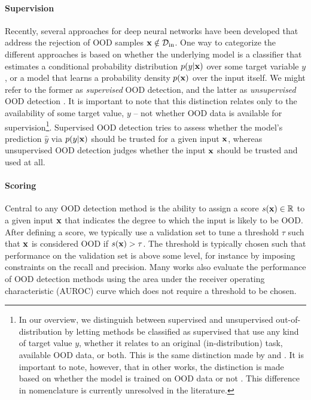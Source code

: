 \paragraph{Supervision} Recently, several approaches for deep neural networks have been developed that address the rejection of OOD samples ${\mathbf{x}}\notin\mathcal{D}_{\text{in}}$. 
One way to categorize the different approaches is based on whether the underlying model is a classifier that estimates a conditional probability distribution $p(y|{\mathbf{x}})$ over some target variable $y$, or a model that learns a probability density $p({\mathbf{x}})$ over the input itself. We might refer to the former as \emph{supervised} OOD detection, and the latter as \emph{unsupervised} OOD detection \parencite{graham_denoising_2023,liu_unsupervised_2023a}. It is important to note that this distinction relates only to the availability of some target value, $y$ -- not whether OOD data is available for supervision\footnote{
    In our overview, we distinguish between supervised and unsupervised out-of-distribution by letting methods be classified as supervised that use any kind of target value $y$, whether it relates to an original (in-distribution) task, available OOD data, or both. This is the same distinction made by \textcite{graham_denoising_2023} and \textcite{liu_unsupervised_2023a}. 
    It is important to note, however, that in other works, the distinction is made based on whether the model is trained on OOD data or not \parencite{hendrycks_baseline_2017,liu_energybased_2020}. This difference in nomenclature is currently unresolved in the literature. 
}. 
Supervised OOD detection tries to assess whether the model's prediction $\hat{y}$ via $p(y|{\mathbf{x}})$ should be trusted for a given input ${\mathbf{x}}$, whereas unsupervised OOD detection judges whether the input ${\mathbf{x}}$ should be trusted and used at all. 

\paragraph{Scoring} Central to any OOD detection method is the ability to assign a score $s({\mathbf{x}}) \in \mathbb{R}$ to a given input ${\mathbf{x}}$ that indicates the degree to which the input is likely to be OOD. After defining a score, we typically use a validation set to tune a threshold $\tau$ such that ${\mathbf{x}}$ is considered OOD if $s({\mathbf{x}}) > \tau$. The threshold is typically chosen such that performance on the validation set is above some level, for instance by imposing constraints on the recall and precision. Many works also evaluate the performance of OOD detection methods using the area under the receiver operating characteristic (AUROC) curve which does not require a threshold to be chosen.

